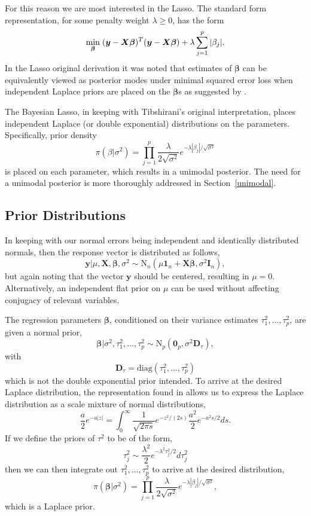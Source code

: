 \documentclass{uwstat572}
\begin{document}
For this reason we are most interested in the Lasso. The standard form representation, for some penalty weight $\lambda \geq 0$, has the form \[
\min_{\boldsymbol{\beta}}  \hspace{.1cm} (\boldsymbol{y}-\boldsymbol{X}\boldsymbol{\beta})^T(\boldsymbol{y}-\boldsymbol{X}\boldsymbol{\beta})+\lambda\sum_{j=1}^p|\beta_j|.
\] In the Lasso original derivation it was noted that estimates of $\boldsymbol\beta$ can be equivalently viewed as posterior modes under minimal squared error loss when independent Laplace priors are placed on the $\boldsymbol{\beta}$s as suggested by \cite{tibshirani1996regression}.

The Bayesian Lasso, in keeping with Tibshirani's original interpretation, places independent Laplace (or double exponential) distributions on the parameters. Specifically, prior density \[
\pi(\beta|\sigma^2)=\prod_{j=1}^p\frac{\lambda}{2\sqrt{\sigma^2}}e^{-\lambda |\beta_j|/\sqrt{\sigma^2}}
\] is placed on each parameter, which results in a unimodal posterior. The need for a unimodal posterior is more thoroughly addressed in Section~\ref{unimodal}.

\subsection{Prior Distributions}
In keeping with our normal errors being independent and identically distributed normals, then the response vector is distributed as follows, \[
\mathbf{y}|\mu,\mathbf{X},\boldsymbol\beta,\sigma^2 \sim \text{N}_n(\mu \mathbf{1}_n+\mathbf{X}\boldsymbol\beta,\sigma^2\mathbf{I}_n), \] but again noting that the vector $\mathbf{y}$ should be centered, resulting in $\mu=0$. Alternatively, an independent flat prior on $\mu$ can be used without affecting conjugacy of relevant variables.

The regression parameters $\boldsymbol\beta$, conditioned on their variance estimates $\tau_1^2,...,\tau_p^2$, are given a normal prior, \[ 
\boldsymbol\beta|\sigma^2,\tau^2_1,...,\tau^2_p\sim\text{N}_p(\mathbf{0}_p,\sigma^2\mathbf{D}_\tau),\] with \[ \mathbf{D}_\tau=\text{diag}(\tau_1^2,...,\tau^2_p) \] which is not the double exponential prior intended. To arrive at the desired Laplace distribution, the representation found in \cite{andrews1974scale} allows us to express the Laplace distribution as a scale mixture of normal distributions, \[ \frac{a}{2}e^{-a|z|}=\int^\infty_0
\frac{1}{\sqrt{2\pi s}}e^{-z^2/(2s)}\frac{a^2}{2}e^{-a^2s/2}ds.\] If we define the priors of $\tau^2$ to be of the form, \[ \tau^2_j \sim \frac{\lambda^2}{2}e^{-\lambda^2\tau^2_j/2}d\tau^2_j\] then we can then integrate out $\tau^2_1,...,\tau^2_p$ to arrive at the desired distribution, \[ \pi(\boldsymbol\beta|\sigma^2)=\prod^p_{j=1}\frac{\lambda}{2\sqrt{\sigma^2}}e^{-\lambda|\beta_j|/\sqrt{\sigma^2}}, \] which is a Laplace prior. 
\end{document}
